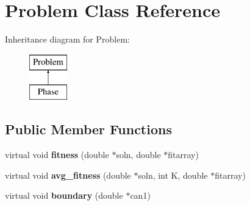 \hypertarget{classProblem}{}\section{Problem Class Reference}
\label{classProblem}
Inheritance diagram for Problem\+:\begin{figure}[H]
\begin{center}
\leavevmode
\includegraphics[height=2.000000cm]{classProblem}
\end{center}
\end{figure}
\subsection*{Public Member Functions}
\begin{DoxyCompactItemize}
\item 
\hypertarget{classProblem_a0109e1edec5b5b0fa682c5037132c308}{}virtual void {\bfseries fitness} (double $\ast$soln, double $\ast$fitarray)\label{classProblem_a0109e1edec5b5b0fa682c5037132c308}

\item 
\hypertarget{classProblem_a5a889257574b59d70c30e77f96657633}{}virtual void {\bfseries avg\+\_\+fitness} (double $\ast$soln, int K, double $\ast$fitarray)\label{classProblem_a5a889257574b59d70c30e77f96657633}

\item 
\hypertarget{classProblem_a866551d6c3a8c639eed39dd629459145}{}virtual void {\bfseries boundary} (double $\ast$can1)\label{classProblem_a866551d6c3a8c639eed39dd629459145}

\end{DoxyCompactItemize}
